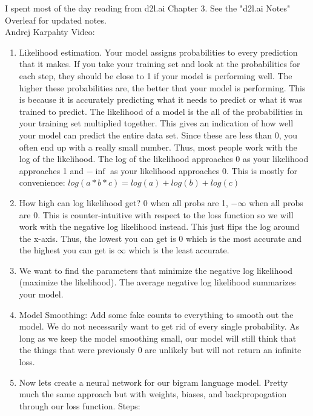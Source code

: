 \documentclass[a4paper, 11pt, oneside]{researchjournal} %
\begin{document}

I spent most of the day reading from d2l.ai Chapter 3. See the "d2l.ai Notes" Overleaf for updated notes. 
\\

Andrej Karpahty Video: \cite{AndrejKarpathyMakemoreVideo}
\begin{enumerate}
    \item Likelihood estimation. Your model assigns probabilities to every prediction that it makes. If you take your training set and look at the probabilities for each step, they should be close to 1 if your model is performing well. The higher these probabilities are, the better that your model is performing. This is because it is accurately predicting what it needs to predict or what it was trained to predict. The likelihood of a model is the all of the probabilities in your training set multiplied together. This gives an indication of how well your model can predict the entire data set. Since these are less than 0, you often end up with a really small number. Thus, most people work with the log of the likelihood. The log of the likelihood approaches 0 as your likelihood approaches 1 and $-\inf$ as your likelihood approaches 0. This is mostly for convenience: $log(a*b*c) = log(a)+log(b)+log(c)$
    \item How high can log likelihood get? 0 when all probs are 1, $-\infty$ when all probs are 0. This is counter-intuitive with respect to the loss function so we will work with the negative log likelihood instead. This just flips the log around the x-axis. Thus, the lowest you can get is 0 which is the most accurate and the highest you can get is $\infty$ which is the least accurate. 
    \item We want to find the parameters that minimize the negative log likelihood (maximize the likelihood). The average negative log likelihood summarizes your model. 
    \item Model Smoothing: Add some fake counts to everything to smooth out the model. We do not necessarily want to get rid of every single probability. As long as we keep the model smoothing small, our model will still think that the things that were previously 0 are unlikely but will not return an infinite loss. 
    \item Now lets create a neural network for our bigram language model. Pretty much the same approach but with weights, biases, and backpropogation through our loss function. Steps:
    \begin{enumerate}

\end{enumerate}
\end{enumerate}
\end{document}
